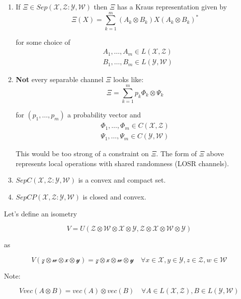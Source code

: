 \documentclass{article}
\begin{document}
\begin{enumerate}
    \item If $\Xi \in Sep(\mathcal{X},\mathcal{Z}:\mathcal{Y},\mathcal{W})$
        then $\Xi$ has a Kraus representation given by
        \[ 
                \Xi(X) = \sum_{k=1}^m (A_k \otimes B_k) X (A_k \otimes
                B_k)^* 
        \]

        for some choice of 
        \begin{align*}
            &A_1, \ldots, A_m \in L(\mathcal{X},\mathcal{Z}) \\
            &B_1, \ldots, B_m \in L(\mathcal{Y},\mathcal{W})
        \end{align*}
    \item \textbf{Not} every separable channel $\Xi$ looks like:
        \[ 
                \Xi = \sum_{k=1}^m p_k \Phi_k \otimes \Psi_k 
        \]

        for $(p_1,\ldots,p_m)$ a probability vector and
        \begin{align*}
            \Phi_1, \ldots, \Phi_m \in C(\mathcal{X},\mathcal{Z}) \\
            \Psi_1, \ldots, \Psi_m \in C(\mathcal{Y},\mathcal{W})
        \end{align*}

        This would be too strong of a constraint on $\Xi$. 
        The form of $\Xi$ above represents local operations with shared
        randomness (LOSR channels).
    \item   $SepC(\mathcal{X},\mathcal{Z}:\mathcal{Y},\mathcal{W})$ is a convex
        and compact set.
    \item   $SepCP(\mathcal{X},\mathcal{Z}:\mathcal{Y},\mathcal{W})$ is closed
        and convex.
\end{enumerate}

Let's define an isometry 

\[ 
V = U(\mathcal{Z}\otimes \mathcal{W} \otimes
    \mathcal{X} \otimes \mathcal{Y}, \mathcal{Z} \otimes \mathcal{X} \otimes
\mathcal{W} \otimes \mathcal{Y})
\]

as

\[ 
        V(\mathcal{z}\otimes \mathcal{w} \otimes \mathcal{x} \otimes
        \mathcal{y}) = \mathcal{z} \otimes \mathcal{x} \otimes \mathcal{w}
        \otimes \mathcal{y} \quad \forall x \in \mathcal{X}, y \in \mathcal{Y},
        z \in \mathcal{Z}, w \in \mathcal{W}
\]

Note:

\[ 
        V vec(A \otimes B) = vec(A) \otimes vec(B) \quad \forall A \in
        L(\mathcal{X},\mathcal{Z}), B \in L(\mathcal{Y},\mathcal{W})
\]
\end{document}
